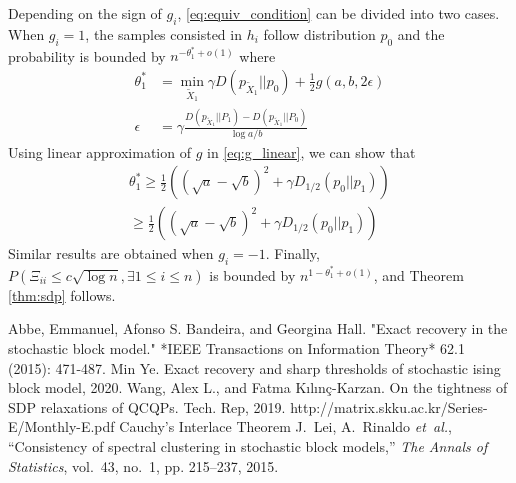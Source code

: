 \documentclass{article}
\begin{document}
Depending on the sign of $g_i$, \eqref{eq:equiv_condition} can be divided into two cases. When $g_i=1$, the samples consisted in $h_i$
follow distribution $p_0$ and the probability is bounded by $n^{-\theta^*_1 + o(1)}$ where
\begin{align}
\theta^*_1 &= \min_{\widetilde{X}_1} \gamma D(p_{\widetilde{X}_1}|| p_0)+ \frac{1}{2} g(a,b, 2\epsilon) \label{eq:theta_star2} \\
\epsilon &= \gamma \frac{D(p_{\widetilde{X}_1} || P_1) - D(p_{\widetilde{X}_1} || P_0) }{\log a /b}
\end{align}
Using linear approximation of $g$ in \eqref{eq:g_linear}, we can show that 
\begin{align*}
\theta^*_1 \geq \frac{1}{2}((\sqrt{a}-\sqrt{b})^2+\gamma D_{1/2}(p_0||p_1)) \\
\geq \frac{1}{2}((\sqrt{a}-\sqrt{b})^2+\gamma D_{1/2}(p_0||p_1))
\end{align*}
Similar results are obtained when $g_i=-1$. Finally,
$P(\Xi_{ii} \leq c\sqrt{\log n}, \exists 1\leq i \leq n)$ is bounded by $n^{1-\theta_1^*+o(1)}$, and Theorem \ref{thm:sdp} follows.
\begin{thebibliography}{9}
	 Abbe, Emmanuel, Afonso S. Bandeira, and Georgina Hall. "Exact recovery in the stochastic block model." *IEEE Transactions on Information Theory* 62.1 (2015): 471-487.
	 	Min Ye.
	\newblock Exact recovery and sharp thresholds of stochastic ising block model,
	2020.
	 Wang, Alex L., and Fatma Kılınç-Karzan. On the tightness of SDP relaxations of QCQPs. Tech. Rep, 2019.
	 http://matrix.skku.ac.kr/Series-E/Monthly-E.pdf Cauchy’s Interlace Theorem
	J.~Lei, A.~Rinaldo \emph{et~al.}, ``Consistency of spectral clustering in
	stochastic block models,'' \emph{The Annals of Statistics}, vol.~43, no.~1,
	pp. 215--237, 2015.
\end{thebibliography}
\end{document}
